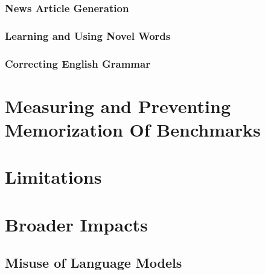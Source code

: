 \documentclass{article}
\begin{document}
        \subsubsection{News Article Generation}
        \label{section:News_Article_Generation}
        

        
        
        \subsubsection{Learning and Using Novel Words}
        \label{section:Learning_and_Using_Novel_Words}
        
        
        \subsubsection{Correcting English Grammar}
        \label{section:Correcting_English_Grammar}
        
%
\section{Measuring and Preventing Memorization Of Benchmarks}

\label{section:measuring_and_preventing_memorization_of_benchmarks}

%
%
\section{Limitations}
\label{section:Limitations}

%
%
\section{Broader Impacts}
\label{section:Broader_Impacts}


    \subsection{Misuse of Language Models}
    \label{section:misuse_of_language_models}
    
\end{document}
